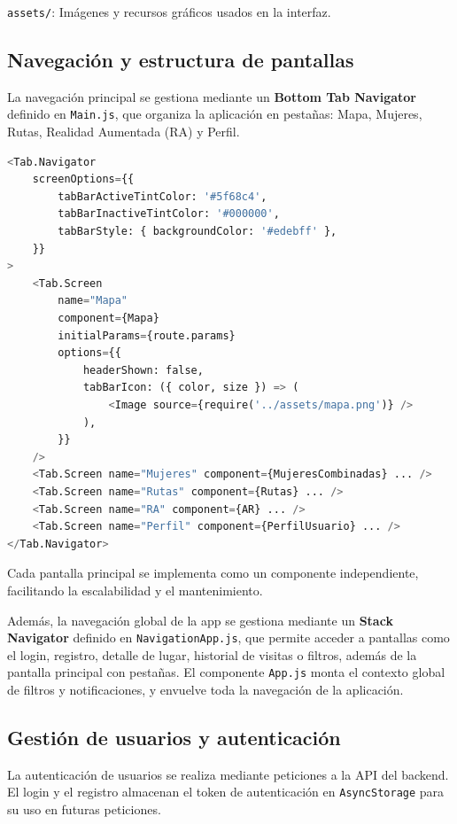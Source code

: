 \texttt{assets/}: Imágenes y recursos gráficos usados en la interfaz.

\subsection{Navegación y estructura de pantallas}

La navegación principal se gestiona mediante un \textbf{Bottom Tab Navigator} definido en \texttt{Main.js}, que organiza la aplicación en pestañas: Mapa, Mujeres, Rutas, Realidad Aumentada (RA) y Perfil.

\begin{lstlisting}[language=Python, caption={Definición de pestañas en Main.js}]
<Tab.Navigator
    screenOptions={{
        tabBarActiveTintColor: '#5f68c4',
        tabBarInactiveTintColor: '#000000',
        tabBarStyle: { backgroundColor: '#edebff' },
    }}
>
    <Tab.Screen 
        name="Mapa" 
        component={Mapa} 
        initialParams={route.params} 
        options={{ 
            headerShown: false,
            tabBarIcon: ({ color, size }) => (
                <Image source={require('../assets/mapa.png')} />
            ),
        }} 
    />
    <Tab.Screen name="Mujeres" component={MujeresCombinadas} ... />
    <Tab.Screen name="Rutas" component={Rutas} ... />
    <Tab.Screen name="RA" component={AR} ... />
    <Tab.Screen name="Perfil" component={PerfilUsuario} ... />
</Tab.Navigator>
\end{lstlisting}

Cada pantalla principal se implementa como un componente independiente, facilitando la escalabilidad y el mantenimiento.

Además, la navegación global de la app se gestiona mediante un \textbf{Stack Navigator} definido en \texttt{NavigationApp.js}, que permite acceder a pantallas como el login, registro, detalle de lugar, historial de visitas o filtros, además de la pantalla principal con pestañas. El componente \texttt{App.js} monta el contexto global de filtros y notificaciones, y envuelve toda la navegación de la aplicación.
\subsection{Gestión de usuarios y autenticación}

La autenticación de usuarios se realiza mediante peticiones a la API del backend. El login y el registro almacenan el token de autenticación en \texttt{AsyncStorage} para su uso en futuras peticiones.

